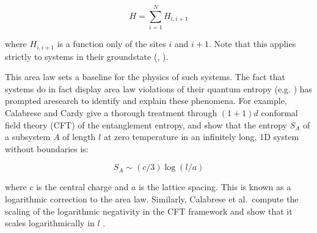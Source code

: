 \begin{equation}
H=\sum_{i=1}^{N} H_{i, i+1}
\end{equation}

where $H_{i, i+1}$ is a function only of the sites $i$ and $i + 1$. Note that this applies strictly to systems in their groundstate (\cite{page_entropy_1993}, \cite{eisert_review}). 

  This area law sets a baseline for the physics of such systems. The fact that systems do in fact display area law violations of their quantum entropy (e.g. \cite{wolf_fermion_corrections}) has prompted aresearch to identify and explain these phenomena. For example, Calabrese and Cardy \cite{calabrese_entanglement_2004} give a thorough treatment through $(1+1)d$ conformal field theory (CFT) of the entanglement entropy, and show that the entropy $S_A$ of a subsystem $A$ of length $l$ at zero temperature in an infinitely long, 1D system without boundaries is:

\begin{equation}
	S_A \sim (c/3) \log{(l / a)}
\end{equation}

where $c$ is the central charge and $a$ is the lattice spacing. This is known as a logarithmic correction to the area law. Similarly, Calabrese et al.\ compute the scaling of the logarithmic negativity in the CFT framework and show that it scales logarithmically in $l$ \cite{calabrese_qft_2012}. 

